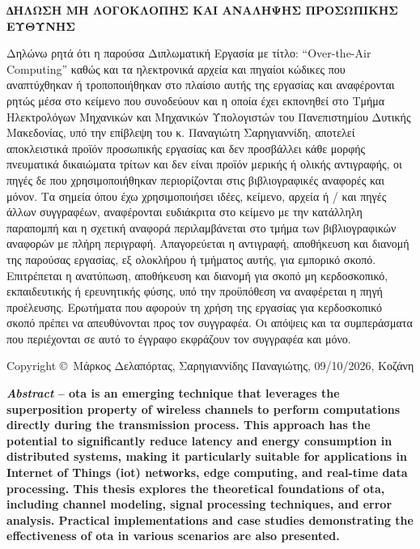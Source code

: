 \documentclass[12pt]{article}
\begin{document}
\newpage
\thispagestyle{empty}
\null
\newpage

\thispagestyle{empty}
\vspace*{1.5cm}
\begin{center}
    {\large \textbf{\textsf{∆ΗΛΩΣΗ ΜΗ ΛΟΓΟΚΛΟΠΗΣ ΚΑΙ ΑΝΑΛΗΨΗΣ ΠΡΟΣΩΠΙΚΗΣ ΕΥΘΥΝΗΣ}}}\\[1.8em]
\end{center}

Δηλώνω ρητά ότι η παρούσα Διπλωματική Εργασία με τίτλο: “Over-the-Air Computing” καθώς και
τα ηλεκτρονικά αρχεία και πηγαίοι κώδικες που αναπτύχθηκαν ή τροποποιήθηκαν στο πλαίσιο
αυτής της εργασίας και αναφέρονται ρητώς μέσα στο κείμενο που συνοδεύουν και η οποία έχει
εκπονηθεί στο Τμήμα Ηλεκτρολόγων Μηχανικών και Μηχανικών Υπολογιστών του Πανεπιστημίου
Δυτικής Μακεδονίας, υπό την επίβλεψη του κ. Παναγιώτη Σαρηγιαννίδη, αποτελεί αποκλειστικά
προϊόν προσωπικής εργασίας και δεν προσβάλλει κάθε μορφής πνευματικά δικαιώματα τρίτων και
δεν είναι προϊόν μερικής ή ολικής αντιγραφής, οι πηγές δε που χρησιμοποιήθηκαν
περιορίζονται στις βιβλιογραφικές αναφορές και μόνον. Τα σημεία όπου έχω χρησιμοποιήσει
ιδέες, κείμενο, αρχεία ή / και πηγές άλλων συγγραφέων, αναφέρονται ευδιάκριτα στο κείμενο
με την κατάλληλη παραπομπή και η σχετική αναφορά περιλαμβάνεται στο τμήμα των
βιβλιογραφικών αναφορών με πλήρη περιγραφή. Απαγορεύεται η αντιγραφή, αποθήκευση και
διανομή της παρούσας εργασίας, εξ ολοκλήρου ή τμήματος αυτής, για εμπορικό σκοπό.
Επιτρέπεται η ανατύπωση, αποθήκευση και διανομή για σκοπό μη κερδοσκοπικό, εκπαιδευτικής ή
ερευνητικής φύσης, υπό την προϋπόθεση να αναφέρεται η πηγή προέλευσης. Ερωτήματα που
αφορούν τη χρήση της εργασίας για κερδοσκοπικό σκοπό πρέπει να απευθύνονται προς τον
συγγραφέα. Οι απόψεις και τα συμπεράσματα που περιέχονται σε αυτό το έγγραφο εκφράζουν τον
συγγραφέα και μόνο.

\vspace{1.8em}
\noindent Copyright \copyright\ Μάρκος Δελαπόρτας, Σαρηγιαννίδης
Παναγιώτης, 09/10/2026, Κοζάνη

\clearpage

\textbf{
    \textit{Abstract} -- \gls{ota} is an emerging technique that leverages the
    superposition property of wireless channels to perform
    computations directly during
    the transmission process. This approach has the potential to
    significantly reduce
    latency and energy consumption in distributed systems, making it
    particularly suitable
    for applications in Internet of Things (\gls{iot}) networks, edge
    computing, and
    real-time data processing. This thesis explores the theoretical
    foundations of
    \gls{ota}, including channel modeling, signal processing
    techniques, and error
    analysis. Practical implementations and case studies
    demonstrating the effectiveness
    of \gls{ota} in various scenarios are also presented.
}
\end{document}
